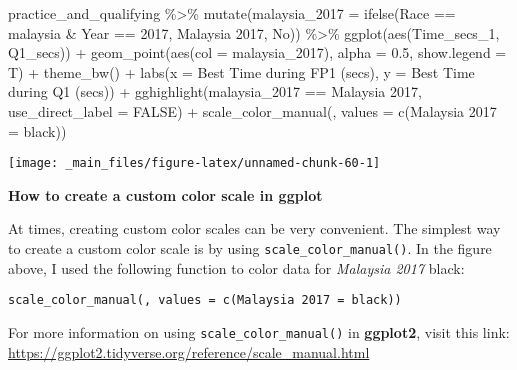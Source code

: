 \documentclass[
]{book}
\newenvironment{Shaded}{\begin{snugshade}}{\end{snugshade}}
\newcommand{\AttributeTok}[1]{\textcolor[rgb]{0.77,0.63,0.00}{#1}}
\newcommand{\ConstantTok}[1]{\textcolor[rgb]{0.00,0.00,0.00}{#1}}
\newcommand{\DecValTok}[1]{\textcolor[rgb]{0.00,0.00,0.81}{#1}}
\newcommand{\FloatTok}[1]{\textcolor[rgb]{0.00,0.00,0.81}{#1}}
\newcommand{\FunctionTok}[1]{\textcolor[rgb]{0.00,0.00,0.00}{#1}}
\newcommand{\NormalTok}[1]{#1}
\newcommand{\OtherTok}[1]{\textcolor[rgb]{0.56,0.35,0.01}{#1}}
\newcommand{\SpecialCharTok}[1]{\textcolor[rgb]{0.00,0.00,0.00}{#1}}
\newcommand{\StringTok}[1]{\textcolor[rgb]{0.31,0.60,0.02}{#1}}
\begin{document}
\begin{Shaded}
\begin{Highlighting}[]
\NormalTok{practice\_and\_qualifying }\SpecialCharTok{\%\textgreater{}\%}
  \FunctionTok{mutate}\NormalTok{(}\AttributeTok{malaysia\_2017 =} \FunctionTok{ifelse}\NormalTok{(Race }\SpecialCharTok{==} \StringTok{\textquotesingle{}malaysia\textquotesingle{}} \SpecialCharTok{\&}\NormalTok{ Year }\SpecialCharTok{==} \DecValTok{2017}\NormalTok{, }\StringTok{\textquotesingle{}Malaysia 2017\textquotesingle{}}\NormalTok{, }\StringTok{\textquotesingle{}No\textquotesingle{}}\NormalTok{)) }\SpecialCharTok{\%\textgreater{}\%} 
  \FunctionTok{ggplot}\NormalTok{(}\FunctionTok{aes}\NormalTok{(Time\_secs\_1, Q1\_secs)) }\SpecialCharTok{+}
  \FunctionTok{geom\_point}\NormalTok{(}\FunctionTok{aes}\NormalTok{(}\AttributeTok{col =}\NormalTok{ malaysia\_2017), }\AttributeTok{alpha =} \FloatTok{0.5}\NormalTok{, }\AttributeTok{show.legend =}\NormalTok{ T) }\SpecialCharTok{+}
  \FunctionTok{theme\_bw}\NormalTok{() }\SpecialCharTok{+}
  \FunctionTok{labs}\NormalTok{(}\AttributeTok{x =} \StringTok{\textquotesingle{}Best Time during FP1 (secs)\textquotesingle{}}\NormalTok{,}
       \AttributeTok{y =} \StringTok{\textquotesingle{}Best Time during Q1 (secs)\textquotesingle{}}\NormalTok{) }\SpecialCharTok{+}
  \FunctionTok{gghighlight}\NormalTok{(malaysia\_2017 }\SpecialCharTok{==} \StringTok{\textquotesingle{}Malaysia 2017\textquotesingle{}}\NormalTok{, }\AttributeTok{use\_direct\_label =} \ConstantTok{FALSE}\NormalTok{) }\SpecialCharTok{+}
  \FunctionTok{scale\_color\_manual}\NormalTok{(}\StringTok{\textquotesingle{}\textquotesingle{}}\NormalTok{, }\AttributeTok{values =} \FunctionTok{c}\NormalTok{(}\StringTok{\textquotesingle{}Malaysia 2017\textquotesingle{}} \OtherTok{=} \StringTok{\textquotesingle{}black\textquotesingle{}}\NormalTok{))}
\end{Highlighting}
\end{Shaded}

\begin{center}\texttt{[image: \_main\_files/figure-latex/unnamed-chunk-60-1]} \end{center}

\begin{blackbox}

\begin{center}
\textbf{How to create a custom color scale in ggplot}

\end{center}

At times, creating custom color scales can be very convenient. The simplest way to create a custom color scale is by using \texttt{scale\_color\_manual()}. In the figure above, I used the following function to color data for \emph{Malaysia 2017} black:

\texttt{scale\_color\_manual(\textquotesingle{}\textquotesingle{},\ values\ =\ c(\textquotesingle{}Malaysia\ 2017\textquotesingle{}\ =\ \textquotesingle{}black\textquotesingle{}))}

For more information on using \texttt{scale\_color\_manual()} in \textbf{ggplot2}, visit this link: \url{https://ggplot2.tidyverse.org/reference/scale_manual.html}

\end{blackbox}
\end{document}
